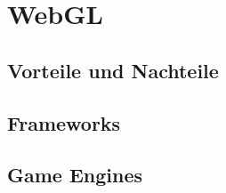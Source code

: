 \section{WebGL}
\subsection{Vorteile und Nachteile}
\subsection{Frameworks}
\subsection{Game Engines}
